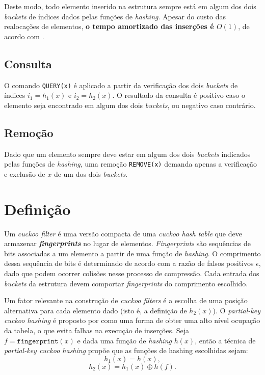 \documentclass[12pt,twoside,english,brazilian]{book}
\begin{document}
Deste modo, todo elemento inserido na estrutura sempre está em algum dos dois \textit{buckets} de índices dados pelas funções de \textit{hashing}. Apesar do custo das realocações de elementos, \textbf{o tempo amortizado das inserções é $O(1)$}, de acordo com \citet{cuckoo}.

\subsection{Consulta}

O comando \texttt{QUERY(x)} é aplicado a partir da verificação dos dois \textit{buckets} de índices $i_1 = h_1(x)$ e $i_2 = h_2(x)$. O resultado da consulta é positivo caso o elemento seja encontrado em algum dos dois \textit{buckets}, ou negativo caso contrário.

\subsection{Remoção}

Dado que um elemento sempre deve estar em algum dos dois \textit{buckets} indicados pelas funções de \textit{hashing}, uma remoção \texttt{REMOVE(x)} demanda apenas a verificação e exclusão de $x$ de um dos dois \textit{buckets}.

\section{Definição}

Um \textit{cuckoo filter} é uma versão compacta de uma \textit{cuckoo hash table} que deve armazenar \textbf{\textit{fingerprints}} no lugar de elementos. \textit{Fingerprints} são sequências de bits associadas a um elemento a partir de uma função de \textit{hashing}. O comprimento dessa sequência de bits é determinado de acordo com a razão de falsos positivos $\epsilon$, dado que podem ocorrer colisões nesse processo de compressão. Cada entrada dos \textit{buckets} da estrutura devem comportar \textit{fingerprints} do comprimento escolhido.

Um fator relevante na construção de \textit{cuckoo filters} é a escolha de uma posição alternativa para cada elemento dado (isto é, a definição de $h_2(x)$). O \textit{partial-key cuckoo hashing} é proposto por \citet{cuckoo} como uma forma de obter uma alto nível ocupação da tabela, o que evita falhas na execução de inserções. Seja $f= \texttt{fingerprint}(x)$ e dada uma função de \textit{hashing} $h(x)$, então a técnica de \textit{partial-key cuckoo hashing} propõe que as funções de hashing escolhidas sejam:  $$h_1(x) = h(x),$$ $$h_2(x) = h_1(x) \oplus h(f).$$
\end{document}
